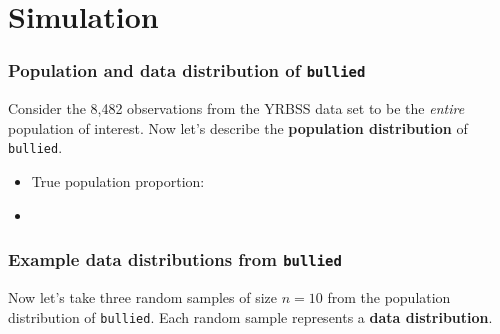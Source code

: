 \section[Simulation]{Simulation}
\begin{frame}
\end{frame}

\begin{frame}
\frametitle{Population and data distribution of \texttt{bullied}}
Consider the 8,482 observations from the YRBSS data set to be the \emph{entire} population of interest.  Now let's describe the \textbf{population distribution} of \texttt{bullied}.
\begin{itemize}
    \item
    True population proportion:
    \item[]
\end{itemize}
\end{frame}

\begin{frame}
\frametitle{Example data distributions from \texttt{bullied}}
 Now let's take three random samples of size $n=10$ from the population distribution of \texttt{bullied}.  Each random sample represents a \textbf{data distribution}.\\
 \vskip10pt
\end{frame}




